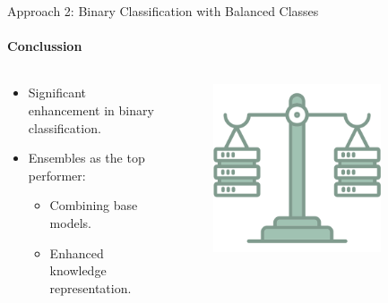 \documentclass[9pt, pstricks, xcolor=dvipsnames]{beamer}
\begin{document}
\begin{frame}{Approach 2: Binary Classification
with Balanced Classes}
\framesubtitle{Conclussion}
\begin{columns}
    \begin{column}{0.5\textwidth}
	\begin{itemize}
	    \item Significant enhancement in binary classification.
	    \item Ensembles as the top performer:
	    \begin{itemize}
	        \item Combining base models.
	        \item Enhanced knowledge representation.
	    \end{itemize}
	\end{itemize}
    \end{column}
    \begin{column}{0.5\textwidth}
        \begin{figure}
            \centering
            \includegraphics[width=0.8\textwidth]{images/load-balancer.png}
        \end{figure}
    \end{column}

\end{columns}
\end{frame}
\end{document}
